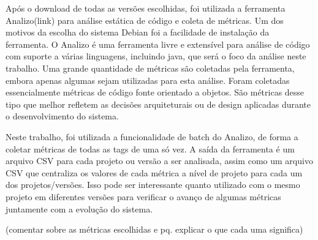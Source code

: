 Após o download de todas as versões escolhidas, foi utilizada a ferramenta Analizo(link) para análise estática de código e coleta de métricas. Um dos motivos da escolha do sistema Debian foi a facilidade de instalação da ferramenta. O Analizo é uma ferramenta livre e extensível para análise de código com suporte a várias linguagens, incluindo java, que será o foco da análise neste trabalho. Uma grande quantidade de métricas são coletadas pela ferramenta, embora apenas algumas sejam utilizadas para  esta análise. Foram coletadas essencialmente métricas de código fonte orientado a objetos. São métricas desse tipo que melhor refletem as decisões arquiteturais ou de design aplicadas durante o desenvolvimento do sistema.

Neste trabalho, foi utilizada a funcionalidade de batch do Analizo, de forma a coletar métricas de todas as tags de uma só vez. A saída da ferramenta é um arquivo CSV para cada projeto ou versão a ser analisada, assim como um arquivo CSV que centraliza os valores de cada métrica a nível de projeto para cada um dos projetos/versões. Isso pode ser interessante quanto utilizado com o mesmo projeto em diferentes versões para verificar o avanço de algumas métricas juntamente com a evolução do sistema.

(comentar sobre as métricas escolhidas e pq. explicar o que cada uma significa)